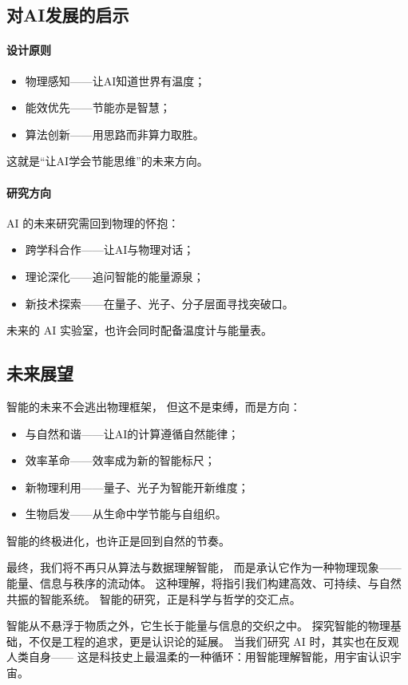 \subsection{对AI发展的启示}

\paragraph{设计原则}
\begin{itemize}
\item 物理感知——让AI知道世界有温度；
\item 能效优先——节能亦是智慧；
\item 算法创新——用思路而非算力取胜。
\end{itemize}
这就是“让AI学会节能思维”的未来方向。

\paragraph{研究方向}
AI 的未来研究需回到物理的怀抱：
\begin{itemize}
\item 跨学科合作——让AI与物理对话；
\item 理论深化——追问智能的能量源泉；
\item 新技术探索——在量子、光子、分子层面寻找突破口。
\end{itemize}
未来的 AI 实验室，也许会同时配备温度计与能量表。

\subsection{未来展望}

智能的未来不会逃出物理框架，  
但这不是束缚，而是方向：
\begin{itemize}
\item 与自然和谐——让AI的计算遵循自然能律；
\item 效率革命——效率成为新的智能标尺；
\item 新物理利用——量子、光子为智能开新维度；
\item 生物启发——从生命中学节能与自组织。
\end{itemize}
智能的终极进化，也许正是回到自然的节奏。

最终，我们将不再只从算法与数据理解智能，  
而是承认它作为一种物理现象——能量、信息与秩序的流动体。  
这种理解，将指引我们构建高效、可持续、与自然共振的智能系统。  
智能的研究，正是科学与哲学的交汇点。

智能从不悬浮于物质之外，它生长于能量与信息的交织之中。  
探究智能的物理基础，不仅是工程的追求，更是认识论的延展。  
当我们研究 AI 时，其实也在反观人类自身——  
这是科技史上最温柔的一种循环：用智能理解智能，用宇宙认识宇宙。


